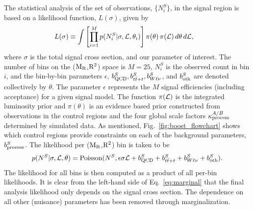 The statistical analysis of the set of observations,  $\{ N^S_i \}$, in the signal region is based
on a likelihood function, $L(\sigma)$, given by
\begin{align}
  L(\sigma) & \equiv  \int   \left[ \prod_{i=1}^M p(N^S_i | \sigma, {\cal L}, \theta_i)  \right] 
\pi(\theta) \, \pi({\cal L}) \, d\theta \, d{\cal L},
\label{eq:marginal}
\end{align}
where $\sigma$ is the total signal cross section, and our parameter of interest.
The number of bins on the ($\mathrm{M_R}$,$\mathrm{R^2}$) space is $M = 25$, $N^S_i$ is the observed count
in bin $i$, and the bin-by-bin parameters  $\epsilon$,  $b^S_{\rm QCD}, b^S_{t\bar{t}+t},
b^S_{W\ell\nu}$, and $b^S_{\rm oth}$ are denoted collectively by $\theta$. 
The parameter $\epsilon$ represents the $M$ signal efficiencies (including acceptance) for a given
signal model. 
%
The function $\pi({\cal L})$ is the integrated luminosity prior and $\pi(\theta)$ is an evidence
based prior constructed from observations in the control regions and the four global scale factors
$\kappa^{A/B}_{\rm process}$ determined by simulated data. 
%
As mentioned, Fig.~\ref{fig:boost_flowchart} shows which control regions provide constraints on
each of the background parameters, $b^S_{\rm process}$.
%
The likelihood per ($\mathrm{M_R}$,$\mathrm{R^2}$) bin is taken to be
\begin{equation}
 p(N^S | \sigma, {\cal L}, \theta) = \textrm{Poisson}(N^S,  \epsilon \sigma {\cal L} + b^S_{\rm QCD}
+ b^S_{t\bar{t}+t} + b^S_{W\ell\nu} +  b^{S}_{\rm oth}) .
\end{equation}
The likelihood for all bins is then computed as a product of all per-bin likelihoods. 
It is clear from the left-hand side of Eq.~\ref{eq:marginal} that the final analysis likelihood only
depends on the signal cross section. The dependence on all other (nuisance) parameters has been
removed through marginalization. 

